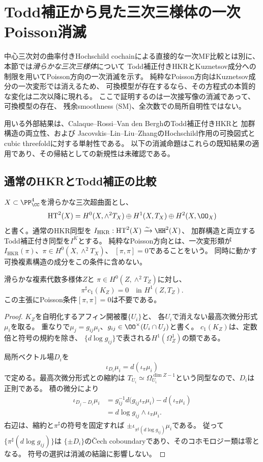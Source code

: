 \section{Todd補正から見た三次三様体の一次Poisson消滅}
\label{pf:sec:first-order}
中心三次対の曲率付きHochschild cochainによる直接的な一次MF比較とは別に、
本節では\emph{滑らかな三次三様体}について
Todd補正付きHKRとKuznetsov成分への制限を用いてPoisson方向の一次消滅を示す。
純粋なPoisson方向はKuznetsov成分の一次変形では消えるため、
可換模型が存在するなら、その方程式の本質的な変化は二次以降に現れる。
ここで証明するのは一次接写像の消滅であって、可換模型の存在、
残余smoothness (SM)、全次数での局所自明性ではない。

用いる外部結果は、Calaque--Rossi--Van den BerghのTodd補正付きHKRと
加群構造の両立性\cite[Theorem 1.4]{PFCRVdB}、および
Jacovskis--Lin--Liu--ZhangのHochschild作用の可換図式と
cubic threefoldに対する単射性\cite[Theorems 3.11 and 4.4(2)]{JLLZER}である。
以下の消滅命題はこれらの既知結果の適用であり、その帰結としての新規性は未確認である。

\subsection{通常のHKRとTodd補正の比較}
$X\subset\PP^4_{\CC}$を滑らかな三次超曲面とし、
\[
 \operatorname{HT}^2(X)
 =H^0(X,\wedge^2T_X)\oplus H^1(X,T_X)\oplus H^2(X,\OO_X)
\]
と書く。通常のHKR同型を
$I_{\mathrm{HKR}}:\operatorname{HT}^2(X)\xrightarrow{\sim}\HH^2(X)$、
加群構造と両立するTodd補正付き同型を$I^K$とする。
純粋なPoisson方向とは、一次変形類が
$I_{\mathrm{HKR}}(\pi)$、$\pi\in H^0(X,\wedge^2T_X)$、
$[\pi,\pi]=0$であることをいう。
同時に動かす可換複素構造の成分をこの条件に含めない。

\begin{lemma}[bivectorによる第一Chern類の縮約]
\label{pf:lem:chern}
滑らかな複素代数多様体$Z$と
$\pi\in H^0(Z,\wedge^2T_Z)$に対し、
\[
 \pi^\sharp c_1(K_Z)=0\quad\text{in }H^1(Z,T_Z).
\]
この主張にPoisson条件$[\pi,\pi]=0$は不要である。
\end{lemma}
\begin{proof}
$K_Z$を自明化するアフィン開被覆$\{U_i\}$と、
各$U_i$で消えない最高次微分形式$\mu_i$を取る。
重なりで$\mu_j=g_{ij}\mu_i$、$g_{ij}\in\OO^\times(U_i\cap U_j)$と書く。
$c_1(K_Z)$は、定数倍と符号の規約を除き、
$\{d\log g_{ij}\}$で表される$H^1(\Omega_Z^1)$の類である。

局所ベクトル場$D_i$を
\[
 \iota_{D_i}\mu_i=d(\iota_\pi\mu_i)
\]
で定める。最高次微分形式との縮約は
$T_{U_i}\simeq\Omega^{\dim Z-1}_{U_i}$という同型なので、$D_i$は正則である。
積の微分により
\begin{align*}
 \iota_{D_j-D_i}\mu_i
 &=g_{ij}^{-1}d\bigl(g_{ij}\iota_\pi\mu_i\bigr)
       -d(\iota_\pi\mu_i)\\
 &=d\log g_{ij}\wedge\iota_\pi\mu_i.
\end{align*}
右辺は、縮約と$\pi^\sharp$の符号を固定すれば
$\pm\iota_{\pi^\sharp(d\log g_{ij})}\mu_i$である。
従って$\{\pi^\sharp(d\log g_{ij})\}$は
$\{\pm D_i\}$の\v{C}ech coboundaryであり、そのコホモロジー類は零となる。
符号の選択は消滅の結論に影響しない。
\end{proof}

